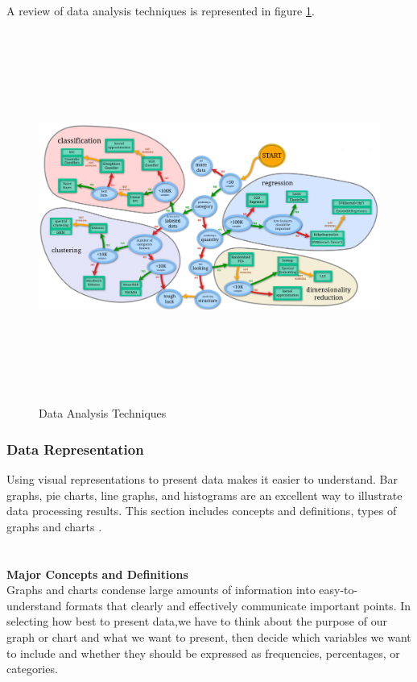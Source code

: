 A review of data analysis techniques is represented in figure \ref{analysis}.
\begin{figure}[H]
\begin{center}
\includegraphics[width=17cm,height=12.2cm]{chapter2prime/fig2.png}
\end{center}
\caption{Data Analysis Techniques}
\label{analysis}
\end{figure}


\subsubsection{Data Representation}
Using visual representations to present data makes it easier to understand. Bar graphs, pie charts, line graphs, and histograms are an excellent way to illustrate data processing results. This section includes concepts and definitions, types of graphs
and charts \cite{cite12}.\\
~\\~\\
\textbf{\normalsize{Major Concepts and Definitions}}\\

Graphs and charts condense large amounts of information into easy-to-understand formats that clearly and effectively communicate important points. In selecting how best to present data,we have to think about the purpose of our graph or chart and what we want to present, then decide which variables we want to include and whether they should be expressed as frequencies, percentages, or categories.\\

